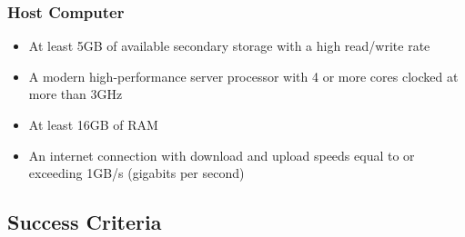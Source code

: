 ﻿\documentclass{article}
\begin{document}
    \subsubsection{Host Computer}
    \begin{itemize}
    \item At least 5GB of available secondary storage with a high read/write rate
    \item A modern high-performance server processor with 4 or more cores clocked at more than 3GHz
    \item At least 16GB of RAM
    \item An internet connection with download and upload speeds equal to or exceeding 1GB/s (gigabits per second)
    \end{itemize}
    
    \subsection{Success Criteria}
\end{document}
